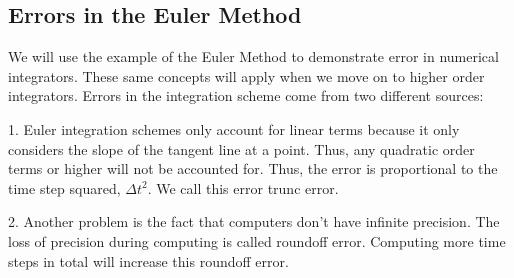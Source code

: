 \documentclass[10pt, openany, titlepage]{book}
\theoremstyle{definition}
\newcounter{example}[chapter]
\begin{document}


\subsection{Errors in the Euler Method}\label{sec:errors in the euler method}
We will use the example of the Euler Method to demonstrate error in numerical integrators. These same concepts will apply when we move on to higher order integrators. Errors in the integration scheme come from two different sources:

1. Euler integration schemes only account for linear terms because it only considers the slope of the tangent line at a point. Thus, any quadratic order terms or higher will not be accounted for. Thus, the error is proportional to the time step squared, $\Delta t^2$. We call this error \gls{trunc error}.

2. Another problem is the fact that computers don’t have infinite precision. The loss of precision during computing is called \gls{roundoff error}. Computing more time steps in total will increase this \gls{roundoff error}.
\end{document}
